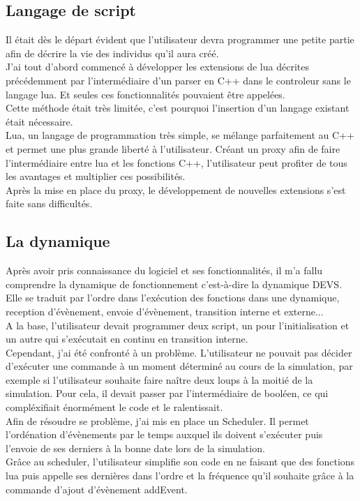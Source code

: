 \subsection{Langage de script}
Il était dès le départ évident que l'utilisateur devra programmer une petite partie afin de décrire la vie des individus qu'il aura créé.\\
J'ai tout d'abord commencé à développer les extensions de lua décrites précédemment par l'intermédiaire d'un parser en C++ dans le controleur sans le langage lua. Et seules ces fonctionnalités pouvaient être appelées.\\
Cette méthode était très limitée, c'est pourquoi l'insertion d'un langage existant était nécessaire.\\
Lua, un langage de programmation très simple, se mélange parfaitement au C++ et permet une plus grande liberté à l'utilisateur. Créant un proxy afin de faire l'intermédiaire entre lua et les fonctions C++, l'utilisateur peut profiter de tous les avantages et multiplier ces possibilités.\\
Après la mise en place du proxy, le développement de nouvelles extensions s'est faite sans difficultés.
\subsection{La dynamique}
Après avoir pris connaissance du logiciel et ses fonctionnalités, il m'a fallu comprendre la dynamique de fonctionnement c'est-à-dire la dynamique DEVS. Elle se traduit par l'ordre dans l'exécution des fonctions dans une dynamique, reception d'évènement, envoie d'évènement, transition interne et externe...\\
A la base, l'utilisateur devait programmer deux script, un pour l'initialisation et un autre qui s'exécutait en continu en transition interne. \\
Cependant, j'ai été confronté à un problème. L'utilisateur ne pouvait pas décider d'exécuter une commande à un moment déterminé au cours de la simulation, par exemple si l'utilisateur souhaite faire naître deux loups à la moitié de la simulation. Pour cela, il devait passer par l'intermédiaire de booléen, ce qui compléxifiait énormément le code et le ralentissait.\\
Afin de résoudre se problème, j'ai mis en place un Scheduler. Il permet l'ordénation d'évènements par le temps auxquel ils doivent s'exécuter puis l'envoie de ses derniers à la bonne date lors de la simulation.\\
Grâce au scheduler, l'utilisateur simplifie son code en ne faisant que des fonctions lua puis appelle ses dernières dans l'ordre et la fréquence qu'il souhaite grâce à la commande d'ajout d'évènement addEvent.

